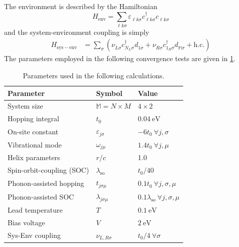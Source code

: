 \documentclass{article}
\newcommand{\pdagger}{{\phantom{\dagger}}}
\begin{document}
The environment is described by the Hamiltonian
\begin{equation}
	H_\mathrm{env} = \sum_{\ell k\sigma} \varepsilon_{\ell k\sigma}^\pdagger c_{\ell k\sigma}^\dagger c_{\ell k\sigma}^\pdagger \label{eq:LeadHamiltonian}
\end{equation}
and the system-environment coupling is simply
\begin{align}
	H_\mathrm{sys-env} &= \sum_{\sigma}(\nu_{L\sigma}^\pdagger c_{N_L\sigma}^\dagger d_{1\sigma}^\pdagger + \nu_{R\sigma}^\pdagger c_{1_R\sigma}^\dagger d_{\mathbb{M}\sigma}^\pdagger + \mathrm{h.c.}) \label{eq:LeadSysHamiltonian}
\end{align}
The parameters employed in the following convergence tests are given in \cref{tab:ParametersConvergence}.
\begin{table}[!h]
	\centering
	\caption{Parameters used in the following calculations.}\label{tab:ParametersConvergence}
\begin{tabular}{lll}
	\toprule
	Parameter & Symbol & Value\\\midrule
	System size &$\mathbb{M}=N\times M$& $4\times 2$  \\
	Hopping integral &$t_0$&$\SI{0.04}{\electronvolt}$ \\ 
	On-site constant &$\varepsilon_{j\sigma}$& $-6t_0 \ \forall j,\sigma$  \\
	Vibrational mode &$\omega_{j\mu}$&$1.4t_0 \  \forall j,\mu$  \\
	Helix parameters &$r/c$& 1.0  \\
	Spin-orbit-coupling (SOC) &$\lambda_\mathrm{so}$& $t_0/40$  \\
	Phonon-assisted hopping &$t_{j\sigma\mu}$& $0.1t_0 \ \forall j,\sigma,\mu$  \\
	Phonon-assisted SOC&$\lambda_{j\sigma\mu}$& $0.1\lambda_\mathrm{so} \ \forall j,\sigma,\mu$  \\
	Lead temperature&$T$& $\SI{0.1}{\electronvolt}$  \\
	Bias voltage &$V$& $\SI{2}{\electronvolt}$ \\
	Sys-Env coupling &$\nu_{L,R\sigma}$ & $t_0/4 \ \forall \sigma$\\
	\bottomrule
\end{tabular}
\end{table}\\
\end{document}
